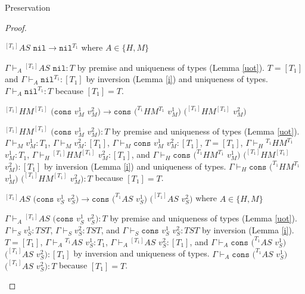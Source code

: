 \begin{theorem}{Preservation}
\begin{proof}
\begin{case}
$^{[T_{1}]}AS$ $\mathtt{nil}\rightarrow\mathtt{nil}^{T_{1}}$ where $A\in\lbrace H,M\rbrace$

$\Gamma\vdash_{A}{^{[T_{1}]}A}S$ $\mathtt{nil}:T$ by premise and uniqueness of types (Lemma \ref{uot}).  $T=[T_{1}]$ and $\Gamma\vdash_{A}\mathtt{nil}^{T_{1}}:[T_{1}]$ by inversion (Lemma \ref{i}) and uniqueness of types.  $\Gamma\vdash_{A}\mathtt{nil}^{T_{1}}:T$ because $[T_{1}]=T$.
\end{case}


\begin{case}
$^{[T_{1}]}HM^{[T_{1}]}$ $(\mathtt{cons}$ $v_{M}^{1}$ $v_{M}^{2})\rightarrow\mathtt{cons}$ $(^{T_{1}}HM^{T_{1}}$ $v_{M}^{1})$ $(^{[T_{1}]}HM^{[T_{1}]}$ $v_{M}^{2})$

$^{[T_{1}]}HM^{[T_{1}]}$ $(\mathtt{cons}$ $v_{M}^{1}$ $v_{M}^{2}):T$ by premise and uniqueness of types (Lemma \ref{uot}).  $\Gamma\vdash_{M}v_{M}^{1}:T_{1}$, $\Gamma\vdash_{M}v_{M}^{2}:[T_{1}]$, $\Gamma\vdash_{M}\mathtt{cons}$ $v_{M}^{1}$ $v_{M}^{2}:[T_{1}]$, $T=[T_{1}]$, $\Gamma\vdash_{H}{^{T_{1}}H}M^{T_{1}}$ $v_{M}^{1}:T_{1}$, $\Gamma\vdash_{H}{^{[T_{1}]}H}M^{[T_{1}]}$ $v_{M}^{2}:[T_{1}]$, and $\Gamma\vdash_{H}\mathtt{cons}$ $(^{T_{1}}HM^{T_{1}}$ $v_{M}^{1})$ $(^{[T_{1}]}HM^{[T_{1}]}$ $v_{M}^{2}):[T_{1}]$ by inversion (Lemma \ref{i}) and uniqueness of types.  $\Gamma\vdash_{H}\mathtt{cons}$ $(^{T_{1}}HM^{T_{1}}$ $v_{M}^{1})$ $(^{[T_{1}]}HM^{[T_{1}]}$ $v_{M}^{2}):T$ because $[T_{1}]=T$.
\end{case}


\begin{case}
$^{[T_{1}]}AS$ $(\mathtt{cons}$ $v_{S}^{1}$ $v_{S}^{2})\rightarrow\mathtt{cons}$ $(^{T_{1}}AS$ $v_{S}^{1})$ $(^{[T_{1}]}AS$ $v_{S}^{2})$ where $A\in\lbrace H,M\rbrace$

$\Gamma\vdash_{A}{^{[T_{1}]}A}S$ $(\mathtt{cons}$ $v_{S}^{1}$ $v_{S}^{2}):T$ by premise and uniqueness of types (Lemma \ref{uot}).  $\Gamma\vdash_{S}v_{S}^{1}:TST$, $\Gamma\vdash_{S}v_{S}^{2}:TST$, and $\Gamma\vdash_{S}\mathtt{cons}$ $v_{S}^{1}$ $v_{S}^{2}:TST$ by inversion (Lemma \ref{i}).  $T=[T_{1}]$, $\Gamma\vdash_{A}{^{T_{1}}A}S$ $v_{S}^{1}:T_{1}$, $\Gamma\vdash_{A}{^{[T_{1}]}A}S$ $v_{S}^{2}:[T_{1}]$, and $\Gamma\vdash_{A}\mathtt{cons}$ $(^{T_{1}}AS$ $v_{S}^{1})$ $(^{[T_{1}]}AS$ $v_{S}^{2}):[T_{1}]$ by inversion and uniqueness of types.  $\Gamma\vdash_{A}\mathtt{cons}$ $(^{T_{1}}AS$ $v_{S}^{1})$ $(^{[T_{1}]}AS$ $v_{S}^{2}):T$ because $[T_{1}]=T$.
\end{case}


\end{proof}
\end{theorem}
